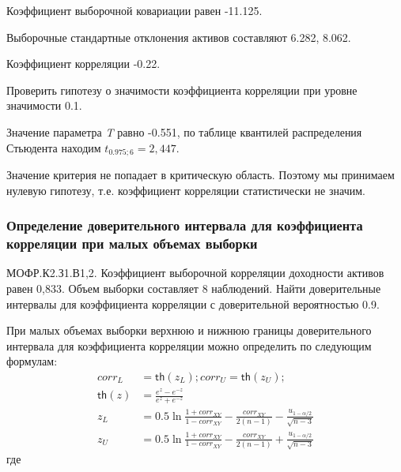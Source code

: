 \documentclass[12pt, table, a4paper,twoside]{exam}
\begin{document}
\begin{questions}
\begin{subparts}
	\begin{solution}[2em]
		
		Коэффициент выборочной ковариации равен -11.125.
		
		Выборочные стандартные отклонения активов составляют 6.282, 8.062.
		
		Коэффициент корреляции -0.22.
	\end{solution}
	
	\subpart[10] Проверить гипотезу о значимости коэффициента корреляции при уровне значимости 0.1.
	
	\begin{solution}[4em]
		
		\raggedright

		Значение параметра \textit{T} равно -0.551, по таблице квантилей распределения Стьюдента находим $t_{0.975;6}=2,447$.
		
		Значение критерия не попадает в критическую область. Поэтому мы принимаем нулевую гипотезу, т.е. коэффициент корреляции статистически не значим.
		
	\end{solution}
	
\end{subparts}
\addpoints

\subsubsection{Определение доверительного интервала для коэффициента корреляции при малых объемах выборки}
\question[20] МОФР.К2.З1.В1,2. Коэффициент выборочной корреляции доходности активов равен 0,833. Объем выборки составляет 8 наблюдений. Найти доверительные интервалы для коэффициента корреляции с доверительной вероятностью 0.9. 

\begin{solution}[6em]

\raggedright
При малых объемах выборки верхнюю и нижнюю границы доверительного интервала для коэффициента корреляции можно определить по следующим формулам:
\begin{align}
corr_L&=\mathsf{th}(z_L); corr_U=\mathsf{th}(z_U);\\
\mathsf{th}(z)&=\frac{e^z-e^{-z}}{e^z+e^{-z}}\\
z_L&=0.5\ln \frac{1+corr_{XY}}{1-corr_{XY}}-\frac{corr_{XY}}{2(n-1)}-\frac{u_{1-\alpha/2}}{\sqrt{n-3}}
\\
z_U&=0.5\ln \frac{1+corr_{XY}}{1-corr_{XY}}-\frac{corr_{XY}}{2(n-1)}+\frac{u_{1-\alpha/2}}{\sqrt{n-3}}
\end{align}
где


\end{solution}
\end{questions}
\end{document}

